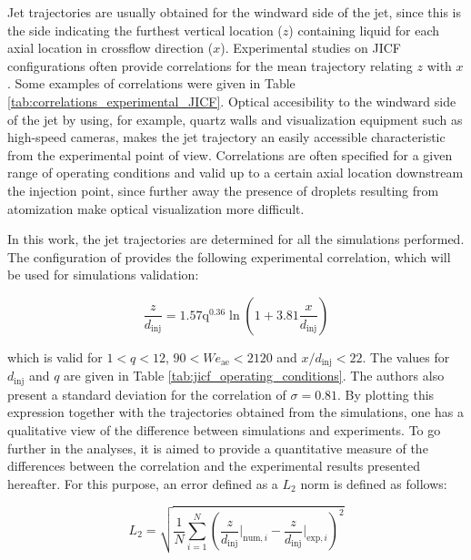 Jet trajectories are usually obtained for the windward side of the jet, since this is the side indicating the furthest vertical location ($z$) containing liquid for each axial location in crossflow direction ($x$). Experimental studies on JICF configurations often provide correlations for the mean trajectory relating $z$ with $x$. Some examples of correlations were given in Table \ref{tab:correlations_experimental_JICF}. Optical accesibility to the windward side of the jet by using, for example, quartz walls and visualization equipment such as high-speed cameras, makes the jet trajectory an easily accessible characteristic from the experimental point of view. Correlations are often specified for a given range of operating conditions and valid up to a certain axial location downstream the injection point, since further away the presence of droplets resulting from atomization make optical visualization more difficult.

In this work, the jet trajectories are determined for all the simulations performed. The configuration of  provides the following experimental correlation, which will be used for simulations validation:

\begin{equation}
    \label{eq:jicf_trajectory_becker}
    \frac{z}{d_\mathrm{inj}} = 1.57 \mathrm{q}^{0.36} \ln \left( 1 + 3.81 \frac{x}{d_\mathrm{inj}} \right)
\end{equation}

which is valid for $1 < q < 12$, $90 < We_\mathrm{ae} < 2120$ and $x/d_\mathrm{inj} < 22$. The values for $d_\mathrm{inj}$ and $q$ are given
in Table \ref{tab:jicf_operating_conditions}. The authors also present a standard deviation for the correlation of $\sigma = 0.81$. By plotting this expression together with the trajectories obtained from the simulations, one has a qualitative view of the difference between simulations and experiments. To go further in the analyses, it is aimed to provide a quantitative measure of the differences between the correlation and the experimental results presented hereafter. For this purpose, an error defined as a $L_2$ norm is defined as follows:

\begin{equation}
\label{eq:L2_JICF}
    L_2 = \sqrt{\frac{1}{N}   \sum_{i=1}^N \left( \frac{z}{d_\mathrm{inj}} \Bigr|_{\mathrm{num},i} -   \frac{z}{d_\mathrm{inj}} \Bigr|_{\mathrm{exp},i} \right)^2}
\end{equation}

